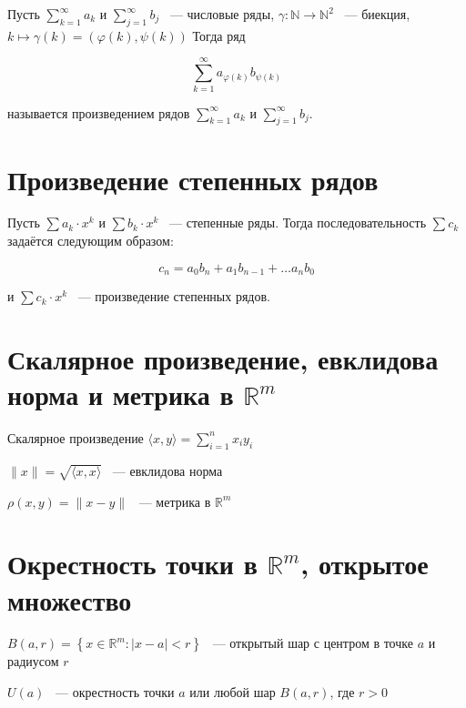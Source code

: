 \documentclass{article}
\begin{document}
        Пусть $\sum\limits^{\infty}_{k = 1} a_k$ и $\sum\limits^{\infty}_{j = 1} b_j$ ~--- числовые ряды, $\gamma : \mathbb{N} \rightarrow \mathbb{N}^2$ ~--- биекция, $k \longmapsto \gamma(k) = (\varphi(k), \psi(k))$ Тогда ряд
        
        $$\sum\limits^{\infty}_{k = 1} a_{\varphi(k)} b_{\psi(k)}$$
        
        называется произведением рядов $\sum\limits^{\infty}_{k = 1} a_k$ и $\sum\limits^{\infty}_{j = 1} b_j$.
        
    \newpage
    
    \section{Произведение степенных рядов}
    
        Пусть $\sum a_k \cdot x^k$ и $\sum b_k \cdot x^k$ ~--- степенные ряды. Тогда последовательность $\sum c_k$ задаётся следующим образом:
        
        $$c_n = a_0 b_n + a_1 b_{n - 1} + \ldots a_n b_0$$ 
        
        и $\sum c_k \cdot x^k$ ~--- произведение степенных рядов.
        
    \newpage
    
    \section{Скалярное произведение, евклидова норма и метрика в $\mathbb{R}^m$}
    
        Скалярное произведение $\langle x, y \rangle = \sum\limits^n_{i = 1} x_i y_i$
        
        $\| x \| = \sqrt{\langle x, x \rangle}$ ~--- евклидова норма
        
        $\rho(x, y) = \| x - y \|$ ~--- метрика в $\mathbb{R}^m$
        
    \newpage
    
    \section{Окрестность точки в $\mathbb{R}^m$, открытое множество}
    
        $B(a, r) = \left\{ x \in \mathbb{R}^m : | x - a | < r \right\}$ ~--- открытый шар с центром в точке $a$ и радиусом $r$
        
        $U(a)$ ~--- окрестность точки $a$ или любой шар $B(a, r)$, где $r > 0$
        
\end{document}
